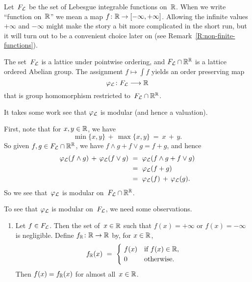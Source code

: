 \documentclass[main.tex]{subfiles}
\begin{document}
%
%
\begin{ex}
\label{E:int-val}
Let~$F_{\mathcal{L}}$ be the set of
Lebesgue integrable functions on~$\mathbb{R}$.
When we write ``function on~$\mathbb{R}$''
we mean a map $f\colon \mathbb{R} \rightarrow {[-\infty,+\infty]}$.
Allowing the infinite values $+\infty$
and $-\infty$
might make the story a bit more complicated
in the short run,
but it will turn out to be a convenient choice later on
(see Remark~\ref{R:non-finite-functions}).


The set~$F_{\mathcal{L}}$ is a lattice
under pointwise ordering,
and  $F_{\mathcal{L}}\cap \mathbb{R}^{\mathbb{R}}$
is a lattice ordered Abelian group.
The assignment $f\mapsto \int f$ 
yields an order preserving map
\begin{equation*}
\varphi_{\mathcal{L}}\colon F_{\mathcal{L}}\longrightarrow \mathbb{R}
\end{equation*}
that is group homomorphism
restricted to~$F_{\mathcal{L}}\cap \mathbb{R}^{\mathbb{R}}$.

It takes some work see that $\varphi_{\mathcal{L}}$ is modular (and hence a valuation).

First,
note that for $x,y\in \mathbb{R}$, we have
\begin{equation*}
\min\{x,y\}\,+\,\max\{x,y\} \ =\ x\,+\,y.
\end{equation*}
So given $f,g\in F_{\mathcal{L}}\cap \mathbb{R}^{\mathbb{R}}$,
we have $f\wedge g + f \vee g = f+ g$,
and hence
\begin{equation}
\label{eq:lint-fin-mod}
\begin{alignedat}{3}
\varphi_{\mathcal{L}}(f\wedge g) \,+\, \varphi_{\mathcal{L}}(f\vee g) 
\ &=\ \varphi_{\mathcal{L}}(f\wedge g + f\vee g)\\
\ &=\  \varphi_{\mathcal{L}}(f+g)\\
\ &=\  \varphi_{\mathcal{L}} (f)\,+\,\varphi_{\mathcal{L}}(g).
\end{alignedat}
\end{equation}
So we see that~$\varphi_{\mathcal{L}}$ is modular on~$F_{\mathcal{L}}\cap \mathbb{R}^{\mathbb{R}}$.

To see that $\varphi_{\mathcal{L}}$ is modular on~$F_{\mathcal{L}}$, we need some observations.
\begin{enumerate}
\item
\label{negl:1}
Let $f\in F_{\mathcal{L}}$.
Then the set of~$x\in \mathbb{R}$ such that $f(x) = +\infty$ 
or $f(x)=-\infty$
is negligible.
Define $f_{\mathbb{R}}\colon \mathbb{R} \rightarrow \mathbb{R}$ by,
for $x\in \mathbb{R}$,
\begin{equation*}
f_{\mathbb{R}}(x) \ =\
\begin{cases}
\ f(x) &\text{if $f(x)\in\mathbb{R}$,}\\
\ 0 &\text{otherwise.}
\end{cases}
\end{equation*}
Then $f(x)=f_{\mathbb{R}}(x)$
for almost all~$x\in \mathbb{R}$.


\end{enumerate}
\end{ex}
\end{document}
